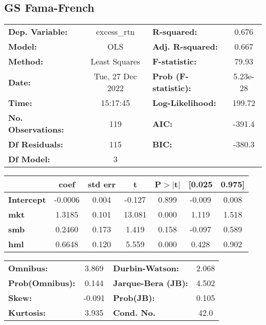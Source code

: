 \documentclass{report}
\begin{document}
\subsection{GS Fama-French}

\begin{center}
\begin{tabular}{lclc}
\toprule
\textbf{Dep. Variable:}    &   excess\_rtn    & \textbf{  R-squared:         } &     0.676   \\
\textbf{Model:}            &       OLS        & \textbf{  Adj. R-squared:    } &     0.667   \\
\textbf{Method:}           &  Least Squares   & \textbf{  F-statistic:       } &     79.93   \\
\textbf{Date:}             & Tue, 27 Dec 2022 & \textbf{  Prob (F-statistic):} &  5.23e-28   \\
\textbf{Time:}             &     15:17:45     & \textbf{  Log-Likelihood:    } &    199.72   \\
\textbf{No. Observations:} &         119      & \textbf{  AIC:               } &    -391.4   \\
\textbf{Df Residuals:}     &         115      & \textbf{  BIC:               } &    -380.3   \\
\textbf{Df Model:}         &           3      & \textbf{                     } &             \\
\bottomrule
\end{tabular}
\begin{tabular}{lcccccc}
                   & \textbf{coef} & \textbf{std err} & \textbf{t} & \textbf{P$> |$t$|$} & \textbf{[0.025} & \textbf{0.975]}  \\
\midrule
\textbf{Intercept} &      -0.0006  &        0.004     &    -0.127  &         0.899        &       -0.009    &        0.008     \\
\textbf{mkt}       &       1.3185  &        0.101     &    13.081  &         0.000        &        1.119    &        1.518     \\
\textbf{smb}       &       0.2460  &        0.173     &     1.419  &         0.158        &       -0.097    &        0.589     \\
\textbf{hml}       &       0.6648  &        0.120     &     5.559  &         0.000        &        0.428    &        0.902     \\
\bottomrule
\end{tabular}
\begin{tabular}{lclc}
\textbf{Omnibus:}       &  3.869 & \textbf{  Durbin-Watson:     } &    2.068  \\
\textbf{Prob(Omnibus):} &  0.144 & \textbf{  Jarque-Bera (JB):  } &    4.502  \\
\textbf{Skew:}          & -0.091 & \textbf{  Prob(JB):          } &    0.105  \\
\textbf{Kurtosis:}      &  3.935 & \textbf{  Cond. No.          } &     42.0  \\
\bottomrule
\end{tabular}
\end{center}
\end{document}

